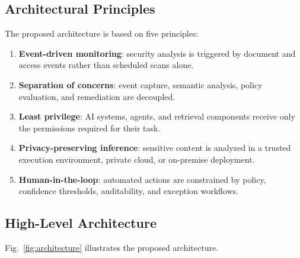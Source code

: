 \documentclass[conference]{IEEEtran}
\begin{document}
\subsection{Architectural Principles}

The proposed architecture is based on five principles:

\begin{enumerate}
  \item \textbf{Event-driven monitoring}: security analysis is triggered by document and access events rather than scheduled scans alone.
  \item \textbf{Separation of concerns}: event capture, semantic analysis, policy evaluation, and remediation are decoupled.
  \item \textbf{Least privilege}: AI systems, agents, and retrieval components receive only the permissions required for their task.
  \item \textbf{Privacy-preserving inference}: sensitive content is analyzed in a trusted execution environment, private cloud, or on-premise deployment.
  \item \textbf{Human-in-the-loop}: automated actions are constrained by policy, confidence thresholds, auditability, and exception workflows.
\end{enumerate}

\subsection{High-Level Architecture}

Fig.~\ref{fig:architecture} illustrates the proposed architecture.
\end{document}
